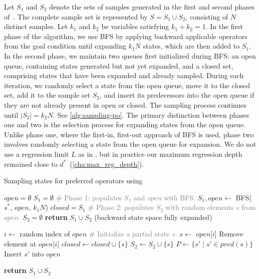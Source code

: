 \documentclass[ppgc,diss,english]{iiufrgs}
\begin{document}
Let $S_1$ and $S_2$ denote the sets of samples generated in the first and second phases of~\bfsrs. The complete sample set is represented by $S = S_1 \cup S_2$, consisting of $N$ distinct samples. Let $k_1$ and $k_2$ be variables satisfying $k_1 + k_{2} = 1$.
In the first phase of the algorithm, we use BFS by applying backward applicable operators from the goal condition until expanding $k_1N$ states, which are then added to $S_1$.
In the second phase, we maintain two queues first initialized during BFS: an open queue, containing states generated but not yet expanded, and a closed set, comprising states that have been expanded and already sampled. During each iteration, we randomly select a state from the open queue, move it to the closed set, add it to the sample set $S_2$, and insert its predecessors into the open queue if they are not already present in open or closed. The sampling process continues until $|S_2| = k_2N$.
See \cref{alg:sampling-po}. The primary distinction between phases one and two is the selection process for expanding states from the open queue. Unlike phase one, where the first-in, first-out approach of BFS is used, phase two involves randomly selecting a state from the open queue for expansion. We do not use a regression limit $L$ as in \bfsrw, but in practice our maximum regression depth remained close to $d^{*}$~(\vref{cha:max_reg_depth}).

\begin{algorithm}[tb]
\caption{Sampling states for preferred operators using \bfsrs}
\label{alg:sampling-po}
\begin{algorithmic}[1]
  \State $open = \emptyset$
  \State $S_{1} = \emptyset$
  \State \textcolor{gray}{\# Phase 1: populates $S_{1}$ and $open$ with BFS.}
  \State $S_{1}, open \gets$ BFS($s^{*}$, $open$, $k_1N$)
  \State $closed = S_{1}$
  \State \textcolor{gray}{\# Phase 2: populates $S_{2}$ with random elements $s$ from $open$.}
  \State $S_{2} = \emptyset$
      \State \textbf{return} $S_{1} \cup S_{2}$ (backward state space fully expanded)
    \EndIf

    \State $i \gets$ random index of $open$
    \State \textcolor{gray}{\# Initialize a partial state $s$.}
    \State $s \gets$ $open$[$i$]
    \State Remove element at $open$[$i$]
    \State $closed \gets closed \cup \{s\}$
    \State $S_{2} \gets S_{2} \cup \{s\}$
    \State $P \gets \{s' \mid s' \in pred(s)\}$
        \State Insert $s'$ into $open$
      \EndIf
    \EndFor
  \EndWhile

  \State \textbf{return} $S_{1} \cup S_{2}$
\EndProcedure
\end{algorithmic}
\end{algorithm}
\end{document}
